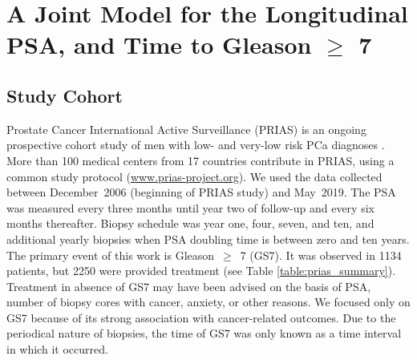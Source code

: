 \section{A Joint Model for the Longitudinal PSA, and Time to Gleason $\geq$ 7}
\label{sec:jm_framework}

\subsection{Study Cohort}
Prostate Cancer International Active Surveillance (PRIAS) is an ongoing prospective cohort study of men with low- and very-low risk PCa diagnoses \citep{bul2013active}. More than 100 medical centers from 17 countries contribute in PRIAS, using a common study protocol (\url{www.prias-project.org}). We used the data collected between December~2006 (beginning of PRIAS study) and May~2019. The PSA was measured every three months until year two of follow-up and every six months thereafter. Biopsy schedule was year one, four, seven, and ten, and additional yearly biopsies when PSA doubling time is between zero and ten years. The primary event of this work is Gleason~$\geq$~7 (GS7). It was observed in 1134 patients, but 2250 were provided treatment (see Table \ref{table:prias_summary}). Treatment in absence of GS7 may have been advised on the basis of PSA, number of biopsy cores with cancer, anxiety, or other reasons. We focused only on GS7 because of its strong association with cancer-related outcomes. Due to the periodical nature of biopsies, the time of GS7 was only known as a time interval in which it occurred.


